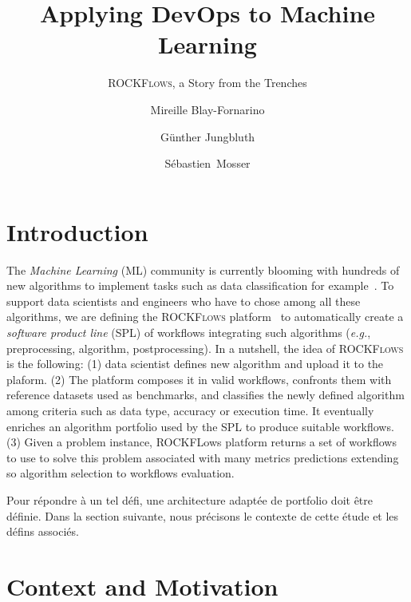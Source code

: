 \documentclass{llncs}
\begin{document}
\title{Applying DevOps to Machine Learning}
\subtitle{\textsc{ROCKFlows}, a Story from the Trenches}

\author{
	Mireille Blay-Fornarino    \and G{\"u}nther Jungbluth
	\and S{\'e}bastien~Mosser}


\maketitle              

\section{Introduction}
The \emph{Machine Learning} (ML) community is currently blooming with hundreds of new algorithms to implement tasks such as data classification for example~\cite{DBLP:journals/jmlr/DelgadoCBA14}. 
To support data scientists and engineers who have to chose among all these algorithms, we are defining the \textsc{ROCKFlows} platform~\cite{DBLP:conf/models/CamillieriPBPRV16,rockflows} to automatically create a \emph{software product line} (SPL) of workflows integrating such algorithms (\emph{e.g.}, preprocessing, algorithm, postprocessing).
In a nutshell, the idea of \textsc{ROCKFlows} is the following: (1) data scientist defines new algorithm and upload it to the plaform. (2) The platform composes it in valid workflows, confronts them with reference datasets used as benchmarks, and classifies the newly defined algorithm among criteria such as data type, accuracy or execution time. It eventually enriches an algorithm portfolio used by the SPL to produce suitable workflows. (3) 
Given a problem instance, ROCKFLows platform returns a set of workflows to use to solve this problem associated with many metrics predictions extending so algorithm selection \cite{Rice1976} to workflows evaluation.

Pour répondre à un tel défi, une architecture adaptée de portfolio doit être définie. Dans la section suivante, nous précisons le contexte de cette étude et les défins associés.


\section{Context and Motivation}
\end{document}
